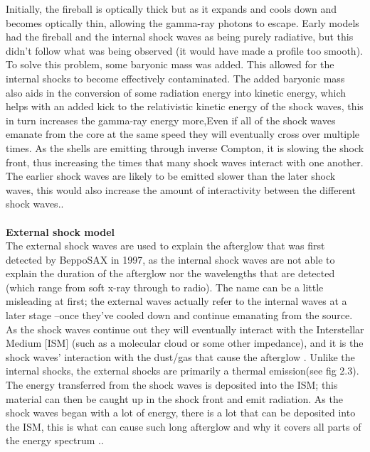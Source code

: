 Initially, the fireball is optically thick but as it expands and cools down and  becomes optically thin, allowing the gamma-ray photons to escape. Early models had the fireball and the internal shock waves as being purely radiative, but this didn't follow what was being observed (it would have made a profile too smooth). To solve this problem, some baryonic mass was added. This allowed for the internal shocks to become effectively contaminated. The added baryonic mass also aids in the conversion of some radiation energy into kinetic energy, which helps with an added kick to the relativistic kinetic energy of the shock waves, this in turn increases the gamma-ray energy more,Even if all of the shock waves emanate from the core at the same speed they will eventually cross over multiple times. As the shells are emitting through inverse Compton, it is slowing the shock front, thus increasing the times that many shock waves interact with one another. The earlier shock waves are likely to be emitted slower than the later  shock waves, this would also increase the amount of interactivity between the different shock waves.\citep{16}\citep{18}.\\\\
\textbf{External shock model}\\
The external shock waves are used to explain the afterglow that was first detected by BeppoSAX in 1997, as the internal shock waves are not able to explain the duration of the afterglow nor the wavelengths that are detected (which range from soft x-ray through to radio). The name can be a little misleading at first; the external waves actually refer to the internal waves at a later stage --once they've cooled down and continue emanating from the source. As the shock waves continue out they will eventually interact with the Interstellar Medium [ISM] (such as a molecular cloud or some other impedance), and it is the shock waves' interaction with the dust/gas that cause the afterglow . Unlike the internal shocks, the external shocks are primarily a thermal emission(see fig 2.3). The energy transferred from the shock waves is deposited into the ISM; this material can then be caught up in the shock front and emit radiation. As the shock waves began with a lot of energy, there is a lot that can be deposited into the ISM, this is what can cause such long afterglow and why it covers all parts of the energy spectrum .\citep{19}\citep{20}.
